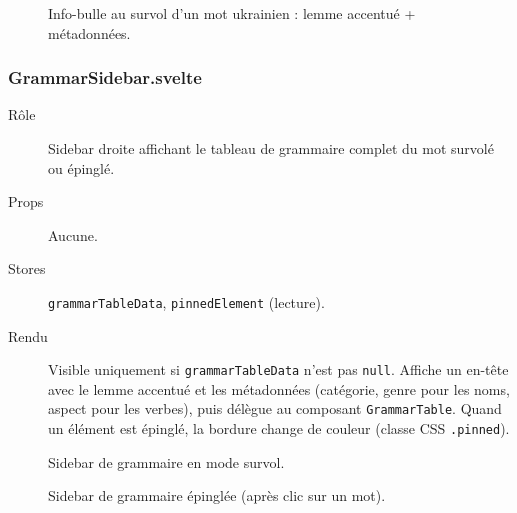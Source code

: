 \begin{figure}[ht]
  \centering
  \caption{Info-bulle au survol d'un mot ukrainien : lemme accentué + métadonnées.}
  \label{fig:hover-bubble}
\end{figure}

\subsubsection{GrammarSidebar.svelte}

\begin{description}
  \item[Rôle] Sidebar droite affichant le tableau de grammaire complet du mot survolé ou épinglé.
  \item[Props] Aucune.
  \item[Stores] \texttt{grammarTableData}, \texttt{pinnedElement} (lecture).
  \item[Rendu] Visible uniquement si \texttt{grammarTableData} n'est pas \texttt{null}. Affiche un en-tête avec le lemme accentué et les métadonnées (catégorie, genre pour les noms, aspect pour les verbes), puis délègue au composant \texttt{GrammarTable}. Quand un élément est épinglé, la bordure change de couleur (classe CSS \texttt{.pinned}).
\end{description}

\begin{figure}[ht]
  \centering
  \caption{Sidebar de grammaire en mode survol.}
  \label{fig:grammar-sidebar}
\end{figure}

\begin{figure}[ht]
  \centering
  \caption{Sidebar de grammaire épinglée (après clic sur un mot).}
  \label{fig:grammar-pinned}
\end{figure}

